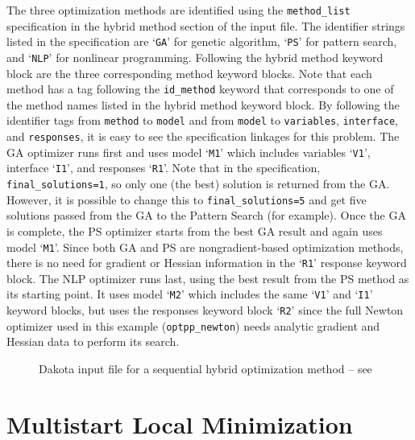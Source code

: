 The three optimization methods are identified using the
\texttt{method\_list} specification in the hybrid method section of the
input file. The identifier strings listed in the specification are
`\texttt{GA}' for genetic algorithm, `\texttt{PS}' for pattern search,
and `\texttt{NLP}' for nonlinear programming. Following the hybrid method
keyword block are the three corresponding method keyword blocks. Note
that each method has a tag following the \texttt{id\_method} keyword
that corresponds to one of the method names listed in the hybrid method
keyword block. By following the identifier tags from \texttt{method}
to \texttt{model} and from \texttt{model} to \texttt{variables},
\texttt{interface}, and \texttt{responses}, it is easy to see the
specification linkages for this problem. The GA optimizer runs first
and uses model `\texttt{M1}' which includes variables `\texttt{V1}',
interface `\texttt{I1}', and responses `\texttt{R1}'. 
Note that in the specification, \texttt{final\_solutions=1}, 
so only one (the best) solution is returned from the GA.  
However, it is possible to change this to \texttt{final\_solutions=5}
and get five solutions passed from the GA to the Pattern Search
(for example).  Once the GA is complete, the PS optimizer starts from the 
best GA result and again
uses model `\texttt{M1}'. Since both GA and PS are nongradient-based
optimization methods, there is no need for gradient or Hessian
information in the `\texttt{R1}' response keyword block. The NLP
optimizer runs last, using the best result from the PS method as its
starting point.  It uses model `\texttt{M2}' which includes the same
`\texttt{V1}' and `\texttt{I1}' keyword blocks, but uses the responses
keyword block `\texttt{R2}' since the full Newton optimizer used in
this example (\texttt{optpp\_newton}) needs analytic gradient and
Hessian data to perform its search.
\begin{figure}
  \centering
  \begin{bigbox}
    \begin{tiny}
    \end{tiny}
  \end{bigbox}
  \caption{Dakota input file for a sequential hybrid optimization method --
see \protect{} }
  \label{adv_meth:figure01}
\end{figure}

\section{Multistart Local Minimization}\label{adv_meth:multistart}

